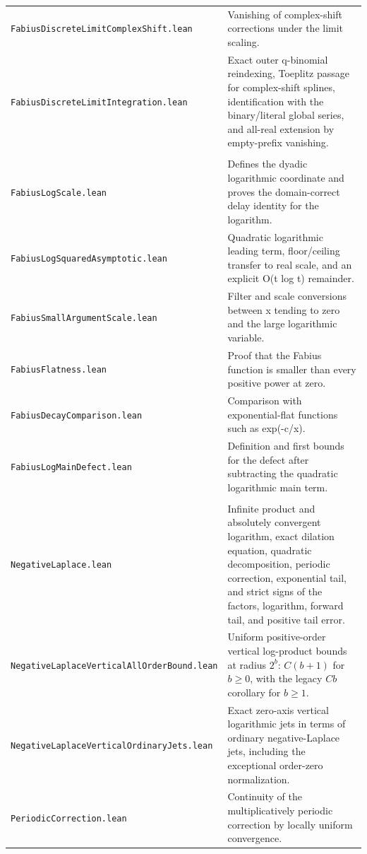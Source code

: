 \documentclass[11pt,oneside]{article}
\theoremstyle{definition}
\theoremstyle{remark}
\begin{document}
\begin{longtable}{>{\raggedright\arraybackslash}p{} >{\raggedright\arraybackslash}p{}}
\nolinkurl{FabiusDiscreteLimitComplexShift.lean} & Vanishing of complex-shift corrections under the limit scaling. \\
\nolinkurl{FabiusDiscreteLimitIntegration.lean} & Exact outer q-binomial reindexing, Toeplitz passage for complex-shift splines, identification with the binary/literal global series, and all-real extension by empty-prefix vanishing. \\
\addlinespace[0.45em]
\multicolumn{2}{l}{\textbf{Coarse endpoint asymptotics}}\\[0.25em]
\nolinkurl{FabiusLogScale.lean} & Defines the dyadic logarithmic coordinate and proves the domain-correct delay identity for the logarithm. \\
\nolinkurl{FabiusLogSquaredAsymptotic.lean} & Quadratic logarithmic leading term, floor/ceiling transfer to real scale, and an explicit O(t log t) remainder. \\
\nolinkurl{FabiusSmallArgumentScale.lean} & Filter and scale conversions between x tending to zero and the large logarithmic variable. \\
\nolinkurl{FabiusFlatness.lean} & Proof that the Fabius function is smaller than every positive power at zero. \\
\nolinkurl{FabiusDecayComparison.lean} & Comparison with exponential-flat functions such as exp(-c/x). \\
\nolinkurl{FabiusLogMainDefect.lean} & Definition and first bounds for the defect after subtracting the quadratic logarithmic main term. \\
\addlinespace[0.45em]
\multicolumn{2}{l}{\textbf{Negative Laplace, Mellin, and periodicity}}\\[0.25em]
\nolinkurl{NegativeLaplace.lean} & Infinite product and absolutely convergent logarithm, exact dilation equation, quadratic decomposition, periodic correction, exponential tail, and strict signs of the factors, logarithm, forward tail, and positive tail error. \\
\nolinkurl{NegativeLaplaceVerticalAllOrderBound.lean} & Uniform positive-order vertical log-product bounds at radius \(2^b\): \(C(b+1)\) for \(b\geq0\), with the legacy \(Cb\) corollary for \(b\geq1\). \\
\nolinkurl{NegativeLaplaceVerticalOrdinaryJets.lean} & Exact zero-axis vertical logarithmic jets in terms of ordinary negative-Laplace jets, including the exceptional order-zero normalization. \\
\nolinkurl{PeriodicCorrection.lean} & Continuity of the multiplicatively periodic correction by locally uniform convergence. \\

\end{longtable}
\end{document}
